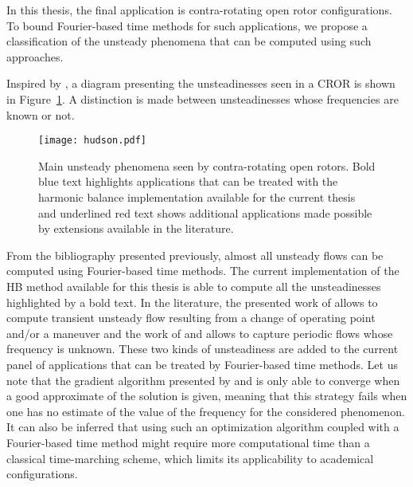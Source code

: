 
In this thesis, the final application is contra-rotating open rotor
configurations. To bound Fourier-based time methods for such
applications, we propose a classification of the
unsteady phenomena that can be computed using such approaches.

Inspired by \citet{Hodson1998},
a diagram presenting the unsteadinesses seen in 
a CROR is shown in Figure~\ref{fig:hudson}. A distinction
is made between unsteadinesses whose frequencies are
known or not.
\begin{figure}[htp]
  \centering
  \texttt{[image: hudson.pdf]}
  \caption{Main unsteady phenomena seen by contra-rotating
  open rotors. Bold blue text highlights applications that can
  be treated with the harmonic balance implementation available for the
  current thesis and underlined red text shows additional applications
  made possible by extensions available in the literature.}
  \label{fig:hudson}
\end{figure}
From the bibliography presented previously, almost all
unsteady flows can be computed using Fourier-based time methods.
The current implementation of the HB method available for
this thesis is able to compute all the unsteadinesses highlighted
by a bold text. In the literature, the presented work of 
\citet{Mavriplis2012} allows to compute transient unsteady flow
resulting from a change of operating point and/or a maneuver and
the work of \citet{McMullen2002} and \citet{Gopinath2006} allows
to capture periodic flows whose frequency is unknown. These two
kinds of unsteadiness are added
to the current panel of applications that can
be treated by Fourier-based time methods. Let us note
that the gradient algorithm presented by \citet{McMullen2002}
and \citet{Gopinath2006} is only able to converge when a 
good approximate of the solution is given, meaning
that this strategy fails when one has no estimate
of the value of the frequency for the considered phenomenon.
It can also be inferred that using such an optimization algorithm
coupled with a Fourier-based time method
might require more computational time than a classical time-marching scheme,
which limits its applicability to academical configurations.


